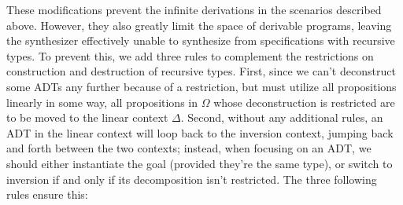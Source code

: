 \documentclass{llncs}
\def\Rho{P}
\begin{document}


These modifications prevent the infinite derivations in the scenarios
described above. However, they also greatly limit the space of
derivable programs, leaving the synthesizer effectively unable to
synthesize from specifications with recursive types. To prevent this,
we add three rules to complement the restrictions on construction
and destruction of recursive types.
%
First, since we can't deconstruct some ADTs any further because of a restriction,
but must utilize all propositions linearly in some way, all propositions in $\Omega$ whose
deconstruction is restricted are to be moved to the linear context $\Delta$.
%
Second, without any additional rules, an ADT in the linear context
will loop back to the inversion context, jumping back and forth
between the two contexts; instead, when focusing on an ADT, we should
either instantiate the goal (provided they're the same type), or switch
to inversion if and only if its decomposition isn't restricted. The
three following rules ensure this:
\end{document}
